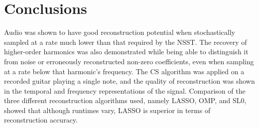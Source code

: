 \documentclass[10pt,a4paper,twoside]{article}
\begin{document}
\section{Conclusions}\label{sec:Conc}
Audio was shown to have good reconstruction potential when stochastically sampled at a rate much lower than that required by the NSST. The recovery of higher-order harmonics was also demonstrated while being able to distinguish it from noise or erroneously reconstructed non-zero coefficients, even when sampling at a rate below that harmonic's frequency. The CS algorithm was applied on a recorded guitar playing a single note, and the quality of reconstruction was shown in the temporal and frequency representations of the signal. Comparison of the three different reconstruction algorithms used, namely LASSO, OMP, and SL0, showed that although runtimes vary, LASSO is superior in terms of reconstruction accuracy.






\end{document}
